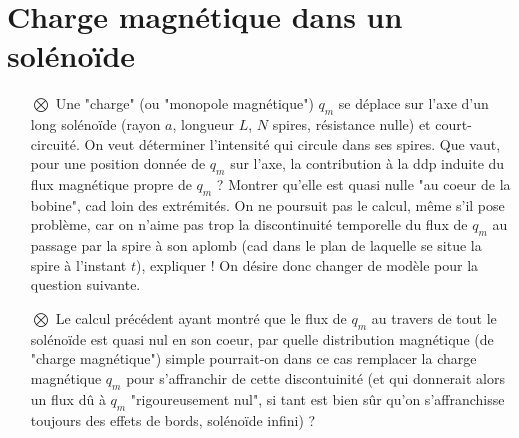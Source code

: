 \documentclass{report}
\begin{document}
\newpage

\section*{Charge magnétique dans un solénoïde}

\begin{itemize}

	\item[$\bigotimes$] Une "charge" (ou "monopole magnétique") $q_m$ se déplace sur l'axe d'un long solénoïde  (rayon $a$, longueur $L$, $N$ spires, résistance nulle) et court-circuité. On veut déterminer l'intensité qui circule dans ses spires. Que vaut, pour une position donnée de $q_m$ sur l'axe, la contribution à la ddp induite du flux magnétique propre de $q_m$ ? Montrer qu'elle est quasi nulle "au coeur de la bobine", cad loin des extrémités. On ne poursuit pas le calcul, même s'il pose problème, car on n'aime pas trop la discontinuité temporelle du flux de $q_m$ au passage par la spire à son aplomb (cad dans le plan de laquelle se situe la spire à l'instant $t$), expliquer ! On désire donc changer de modèle pour la question suivante.
	
	\item[$\bigotimes$] Le calcul précédent ayant montré que le flux de $q_m$ au travers de tout le solénoïde est quasi nul en son coeur, par quelle distribution magnétique (de "charge magnétique") simple pourrait-on dans ce cas remplacer la charge magnétique $q_m$ pour s'affranchir de cette discontuinité (et qui donnerait alors un flux dû à $q_m$ "rigoureusement nul", si tant est bien sûr qu'on s'affranchisse toujours des effets de bords, solénoïde infini) ?

\end{itemize}
\end{document}

